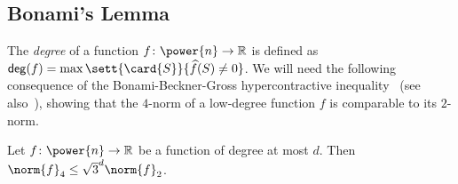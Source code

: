 \subsection{Bonami's Lemma}
The \emph{degree} of a function $f\colon \power{n}\to\mathbb{R}$ is defined as
${\sf deg}(f) = \max\sett{\card{S}}{\widehat{f}(S)\neq 0}$.
We will need the following consequence of
the Bonami-Beckner-Gross hypercontractive inequality~\cite{Bec75,Bonami,grossLogSob} (see also~\cite{ODonnell}), showing that the $4$-norm of a low-degree function $f$ is comparable to its $2$-norm.
\begin{thm}\label{thm:hypercontractivity}
  Let $f\colon\power{n}\to\mathbb{R}$ be a function of degree at most $d$. Then
  $\norm{f}_4\leq \sqrt{3}^d\norm{f}_2$.
\end{thm}
